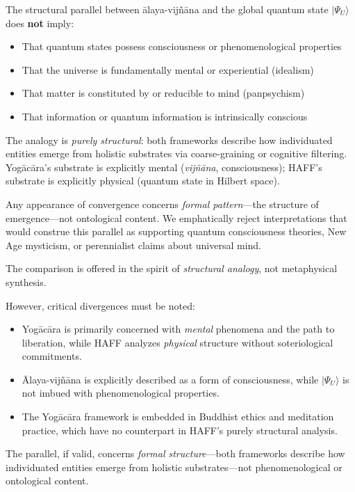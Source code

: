 \documentclass[12pt,a4paper,openany]{book}
\begin{document}
\begin{tcolorbox}[colback=gray!5!white,colframe=black!75!black,title=\textbf{Critical Clarification: Against Panpsychism}]
The structural parallel between \=alaya-vijñ\=ana and the global quantum state $|\Psi_U\rangle$ does \textbf{not} imply:
\begin{itemize}
\item That quantum states possess consciousness or phenomenological properties
\item That the universe is fundamentally mental or experiential (idealism)
\item That matter is constituted by or reducible to mind (panpsychism)
\item That information or quantum information is intrinsically conscious
\end{itemize}

The analogy is \emph{purely structural}: both frameworks describe how individuated entities emerge from holistic substrates via coarse-graining or cognitive filtering. Yog\=ac\=ara's substrate is explicitly mental (\emph{vijñ\=ana}, consciousness); HAFF's substrate is explicitly physical (quantum state in Hilbert space).

Any appearance of convergence concerns \emph{formal pattern}—the structure of emergence—not ontological content. We emphatically reject interpretations that would construe this parallel as supporting quantum consciousness theories, New Age mysticism, or perennialist claims about universal mind.

The comparison is offered in the spirit of \emph{structural analogy}, not metaphysical synthesis.
\end{tcolorbox}

However, critical divergences must be noted:
\begin{itemize}
\item Yog\=ac\=ara is primarily concerned with \emph{mental} phenomena and the path to liberation, while HAFF analyzes \emph{physical} structure without soteriological commitments.
\item \=Alaya-vijñ\=ana is explicitly described as a form of consciousness, while $|\Psi_U\rangle$ is not imbued with phenomenological properties.
\item The Yog\=ac\=ara framework is embedded in Buddhist ethics and meditation practice, which have no counterpart in HAFF's purely structural analysis.
\end{itemize}

The parallel, if valid, concerns \emph{formal structure}—both frameworks describe how individuated entities emerge from holistic substrates—not phenomenological or ontological content.
\end{document}
